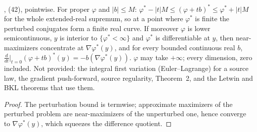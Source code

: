 \begin{lemma}
  \label{lem:legendre-first-variation}
  \leanok
  \cite{CorderoKlartag2015}, (42), pointwise.  For proper $\varphi$ and $|b|\le M$: $\varphi^*-|t|M\le(\varphi+tb)^*\le
  \varphi^*+|t|M$ for the whole extended-real supremum, so at a point where $\varphi^*$ is finite the perturbed conjugates form a
  finite real curve.  If moreover $\varphi$ is lower semicontinuous, $y$ is interior to $\{\varphi^*<\infty\}$ and $\varphi^*$ is
  differentiable at $y$, then near-maximizers concentrate at $\nabla\varphi^*(y)$, and for every bounded continuous real $b$,
  $\frac{d}{dt}\big|_{t=0}(\varphi+tb)^*(y)=-b(\nabla\varphi^*(y))$.  $\varphi$ may take $+\infty$; every dimension, zero
  included.  Not provided: the integral first variation (Euler--Lagrange) for a source law, the gradient push-forward, source
  regularity, Theorem~2, and the Letwin and BKL theorems that use them.
\end{lemma}
\begin{proof}
  \leanok
  The perturbation bound is termwise; approximate maximizers of the perturbed problem are near-maximizers of the unperturbed
  one, hence converge to $\nabla\varphi^*(y)$, which squeezes the difference quotient.
\end{proof}

